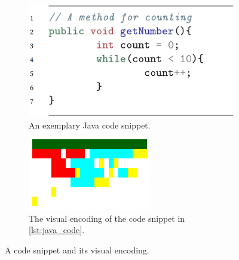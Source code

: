 \documentclass[%
class=scrreprt,
chapterprefix=false,%
open=right,%
twoside=false,%
paper=a4,%
logofile={Logo\_zentral\_farbig\_EN.png},%
thesistype=master,%
UKenglish,%
]{se2thesis}
\theoremstyle{definition}
\begin{document}
	\begin{figure}
		\begin{subfigure}[t]{0.48\textwidth}
			\centering
			\includegraphics[width=\textwidth]{img/visual_encoding_code.png}
			\caption{An exemplary Java code snippet.}
			\label{lst:java_code}
		\end{subfigure}
		\begin{subfigure}[t]{0.48\textwidth}
			\centering
			\includegraphics[width=\textwidth]{img/visual_encoding.png}
			\caption{The visual encoding of the code snippet in \autoref{lst:java_code}.}
			\label{fig:visual_encoding}
		\end{subfigure}
		\caption{A code snippet and its visual encoding.}
		\label{fig:visual_encoding_combined}
	\end{figure}
	
\end{document}
